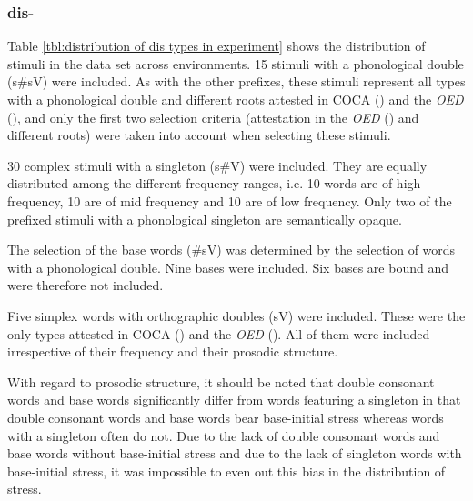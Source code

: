 \subsubsection{dis-} \label{dis stimui}

Table \ref{tbl:distribution of dis types in experiment} shows the distribution of  stimuli in the data set across environments. 
15  stimuli with a phonological double (s\#sV) were included. As with the other prefixes, these stimuli represent all types with a phonological double and different roots attested in COCA (\citealt{Davies.20082014}) and the \textit{OED} (\citealt{OED.2013}),  and only the first two selection criteria (attestation in the \textit{OED} (\citealt{OED.2013}) and different roots) were taken into account when selecting these stimuli. 

30 complex stimuli with a singleton (s\#V) were included. They are equally distributed among the different frequency ranges, i.e. 10 words are of high frequency, 10 are of mid frequency and 10 are of low frequency. 
Only two of the prefixed stimuli with a phonological singleton are semantically opaque. 


The selection of the base words (\#sV) was determined by the selection of words with a phonological double. 
Nine bases were included. Six bases are bound and were therefore not included. 

Five simplex words with orthographic doubles (sV) were included. These were the only types attested in COCA (\citealt{Davies.20082014}) and the \textit{OED} (\citealt{OED.2013}). 
All of them were included irrespective of their frequency and their prosodic structure. 

With regard to prosodic structure, it should be noted that double consonant words and base words significantly differ from words featuring a singleton in that double consonant words and base words bear base-initial stress whereas words with a singleton often do not. Due to the lack of double consonant words and base words without base-initial stress and due to the lack of singleton words with base-initial stress, it was impossible to even out this bias in the distribution of stress.


